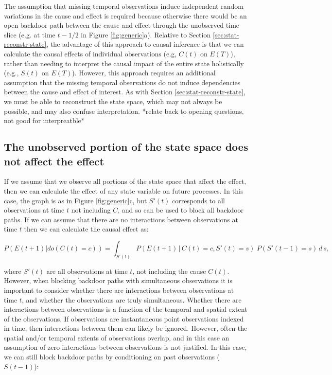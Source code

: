 \documentclass[12pt]{article}
\begin{document}
The assumption that missing temporal observations induce independent
random variations in the cause and effect is required because
otherwise there would be an open backdoor path between the cause and
effect through the unobserved time slice (e.g. at time $t-1/2$ in
Figure \ref{fig:generic}a). Relative to Section
\ref{sec:stat-reconstr-state}, the advantage of this approach to
causal inference is that we can calculate the causal effects of
individual observations (e.g, $C(t)$ on $E(T)$), rather than needing
to interpret the causal impact of the entire state holistically (e.g.,
$S(t)$ on $E(T)$). However, this approach requires an additional
assumption that the missing temporal observations do not induce
dependencies between the cause and effect of interest. As with Section
\ref{sec:stat-reconstr-state}, we must be able to reconstruct the
state space, which may not always be possible, and may also confuse
interpretation. *relate back to opening questions, not good for interpreatble*


\subsection{The unobserved portion of the state space does not affect
  the effect}
\label{sec:observ-port-state}

If we assume that we observe all portions of the state space that
affect the effect, then we can calculate the effect of any state
variable on future processes. In this case, the graph is as in Figure
\ref{fig:generic}c, but $S'(t)$ corresponds to all observations at
time $t$ not including $C$, and so can be used to block all backdoor
paths. If we can assume that there are no interactions between
observations at time $t$ then we can calculate the causal effect as:

\begin{equation}
  P(E(t+1)| do(C(t)=c)) = \int_{S'(t)} P(E(t+1) \, | \, C(t)=c,
  S'(t) = s
  )\; P(S'(t-1)=s) \, d \, s,
\end{equation}

where $S'(t)$ are all observations at time $t$, not including the
cause $C(t)$. However, when blocking backdoor paths with simultaneous
observations it is important to consider whether there are
interactions between observations at time $t$, and whether the
observations are truly simultaneous. Whether there are interactions
between observations is a function of the temporal and spatial extent
of the observations. If observations are instantaneous point
observations indexed in time, then interactions between them can
likely be ignored. However, often the spatial and/or temporal extents
of observations overlap, and in this case an assumption of zero
interactions between observations is not justified. In this case, we
can still block backdoor paths by conditioning on past observations
($S(t-1)$):
\end{document}

